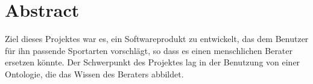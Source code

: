 \chapter{Abstract}

Ziel dieses Projektes war es, ein Softwareprodukt zu entwickelt, das dem Benutzer für ihn passende Sportarten vorschlägt, so dass es einen menschlichen Berater ersetzen könnte. Der Schwerpunkt des Projektes lag in der Benutzung von einer Ontologie, die das Wissen des Beraters abbildet.
